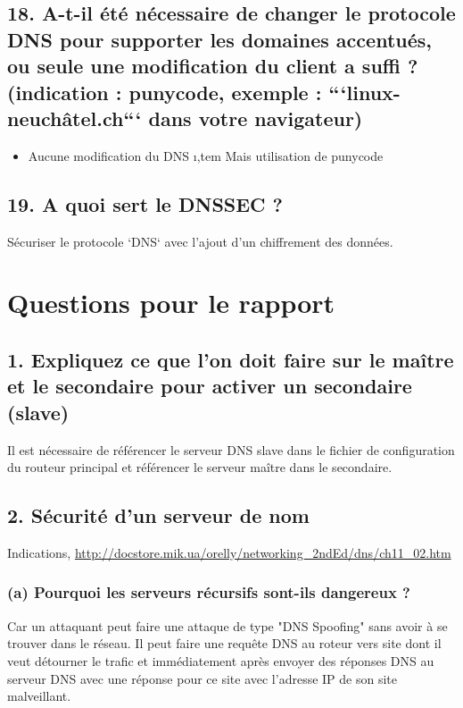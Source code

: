 \documentclass{article}
\begin{document}
\subsection*{18. A-t-il été nécessaire de changer le protocole DNS pour supporter les domaines accentués, ou seule une modification du client a suffi ? (indication : punycode, exemple : ```linux-neuchâtel.ch``` dans votre navigateur)}
\begin{itemize}
\item Aucune modification du DNS
\i,tem Mais utilisation de punycode
\end{itemize}

\subsection*{19. A quoi sert le DNSSEC ?}
Sécuriser le protocole `DNS` avec l'ajout d'un chiffrement des données.



\section{Questions pour le rapport}
\subsection*{1. Expliquez ce que l’on doit faire sur le maître et le secondaire pour activer un secondaire (slave)}
Il est nécessaire de référencer le serveur DNS slave dans le fichier de configuration du routeur principal et référencer le serveur maître dans le secondaire.

\subsection*{2. Sécurité d’un serveur de nom}
Indications,  \url{http://docstore.mik.ua/orelly/networking_2ndEd/dns/ch11_02.htm}

\subsubsection*{(a) Pourquoi les serveurs récursifs sont-ils dangereux ?}
Car un attaquant peut faire une attaque de type "DNS Spoofing" sans avoir à se trouver dans le réseau. Il peut faire une requête DNS au roteur vers site dont il veut détourner le trafic et immédiatement après envoyer des réponses DNS au serveur DNS avec une réponse pour ce site avec l'adresse IP de son site malveillant.
\end{document}
